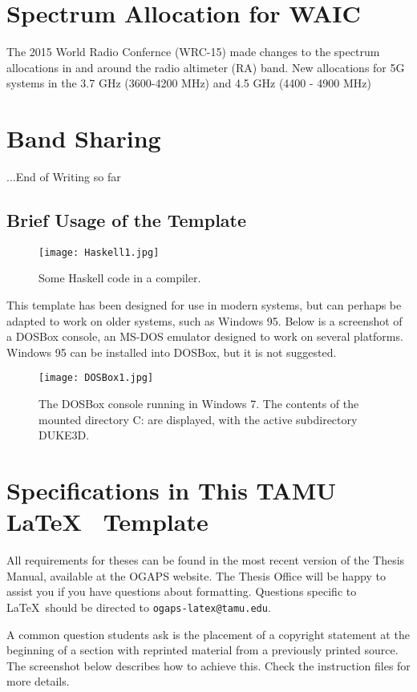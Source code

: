 \section{Spectrum Allocation for WAIC}
The 2015 World Radio Confernce (WRC-15) made changes to the spectrum allocations in and around the radio altimeter (RA) band. New allocations for 5G systems in the 3.7 GHz (3600-4200 MHz) and 4.5 GHz (4400 - 4900 MHz)

\section{Band Sharing}


...End of Writing so far

\subsection{Brief Usage of the Template}


\begin{figure}[!ht]
\centering
	\texttt{[image: Haskell1.jpg]}
	\caption{Some Haskell code in a compiler.}
\end{figure}

This template has been designed for use in modern systems, but can perhaps be adapted to work on older systems, such as Windows 95. Below is a screenshot of a DOSBox console, an MS-DOS emulator designed to work on several platforms. Windows 95 can be installed into DOSBox, but it is not suggested.

\begin{figure}[ht!]
\centering
	\texttt{[image: DOSBox1.jpg]}
	\caption{The DOSBox console running in Windows 7. The contents of the mounted directory C: are displayed, with the active subdirectory DUKE3D.}
\end{figure}

\section{Specifications in This TAMU \LaTeX ~ Template}

All requirements for theses can be found in the most recent version of the Thesis Manual, available at the OGAPS website. The Thesis Office will be happy to assist you if you have questions about formatting. Questions specific to \LaTeX\ should be directed to \texttt{ogaps-latex@tamu.edu}.

A common question students ask is the placement of a copyright statement at the beginning of a section with reprinted material from a previously printed source. The screenshot below describes how to achieve this. Check the instruction files for more details.

